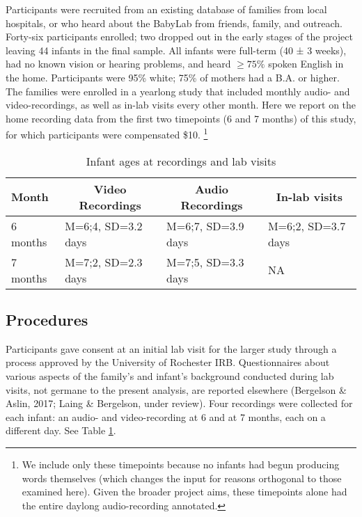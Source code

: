 \documentclass[floatsintext,man]{apa6}
\theoremstyle{definition}
\theoremstyle{definition}
\theoremstyle{definition}
\theoremstyle{remark}
\begin{document}
Participants were recruited from an existing database of families from
local hospitals, or who heard about the BabyLab from friends, family,
and outreach. Forty-six participants enrolled; two dropped out in the
early stages of the project leaving 44 infants in the final sample. All
infants were full-term (40 ± 3 weeks), had no known vision or hearing
problems, and heard \(\geq 75\%\) spoken English in the home.
Participants were 95\% white; 75\% of mothers had a B.A. or higher. The
families were enrolled in a yearlong study that included monthly audio-
and video-recordings, as well as in-lab visits every other month. Here
we report on the home recording data from the first two timepoints (6
and 7 months) of this study, for which participants were compensated
\$10.
\footnote{We include only these timepoints because no infants had begun producing words themselves (which changes the input for reasons orthogonal to those examined here). Given the broader project aims, these timepoints alone had the entire daylong audio-recording annotated.}

\begin{table}[tbp]
\begin{center}
\begin{threeparttable}
\caption{\label{tab:recording-ages-table}Infant ages at recordings and lab visits}
\begin{tabular}{llll}
\toprule
Month & \multicolumn{1}{c}{Video Recordings} & \multicolumn{1}{c}{Audio Recordings} & \multicolumn{1}{c}{In-lab visits}\\
\midrule
6 months & M=6;4, SD=3.2 days & M=6;7, SD=3.9 days & M=6;2, SD=3.7 days\\
7 months & M=7;2, SD=2.3 days & M=7;5, SD=3.3 days & NA\\
\bottomrule
\end{tabular}
\end{threeparttable}
\end{center}
\end{table}

\hypertarget{procedures}{%
\subsection{Procedures}\label{procedures}}

Participants gave consent at an initial lab visit for the larger study
through a process approved by the University of Rochester IRB.
Questionnaires about various aspects of the family's and infant's
background conducted during lab visits, not germane to the present
analysis, are reported elsewhere (Bergelson \& Aslin, 2017; Laing \&
Bergelson, under review). Four recordings were collected for each
infant: an audio- and video-recording at 6 and at 7 months, each on a
different day. See Table \ref{tab:recording-ages-table}.
\end{document}

